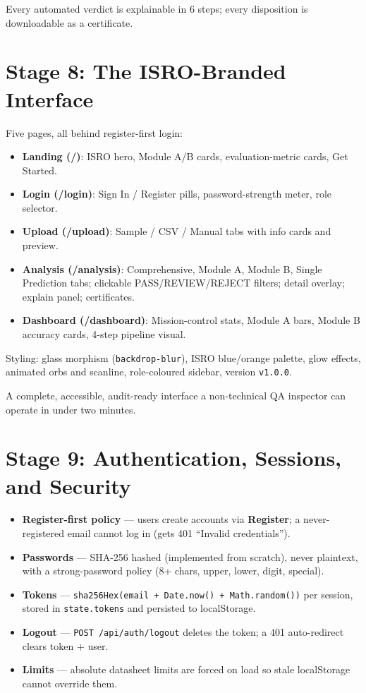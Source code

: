 \documentclass[11pt,a4paper]{article}
\newcommand{\code}[1]{\texttt{\small #1}}
\newcommand{\keys}[1]{\textbf{\sffamily#1}}
\newcommand{\milestone}[1]{\par\vspace{0.6em}\noindent
  \begin{tcolorbox}[colback=solgreen!8,colframe=solgreen,
    title={\sffamily\bfseries\color{white}Milestone},arc=2pt,boxrule=1pt]
    #1
  \end{tcolorbox}\par\vspace{0.4em}}
\begin{document}
\milestone{Every automated verdict is explainable in 6 steps; every disposition is downloadable as
  a certificate.}

\section{Stage 8: The ISRO-Branded Interface}

Five pages, all behind register-first login:
\begin{itemize}[leftmargin=1.5em]
  \item \textbf{Landing (/)}: ISRO hero, Module A/B cards, evaluation-metric cards, Get Started.
  \item \textbf{Login (/login)}: Sign In / Register pills, password-strength meter, role selector.
  \item \textbf{Upload (/upload)}: Sample / CSV / Manual tabs with info cards and preview.
  \item \textbf{Analysis (/analysis)}: Comprehensive, Module A, Module B, Single Prediction tabs;
        clickable PASS/REVIEW/REJECT filters; detail overlay; explain panel; certificates.
  \item \textbf{Dashboard (/dashboard)}: Mission-control stats, Module A bars, Module B accuracy
        cards, 4-step pipeline visual.
\end{itemize}

\noindent Styling: glass morphism (\code{backdrop-blur}), ISRO blue/orange palette, glow effects,
animated orbs and scanline, role-coloured sidebar, version \code{v1.0.0}.

\milestone{A complete, accessible, audit-ready interface a non-technical QA inspector can operate
  in under two minutes.}

\section{Stage 9: Authentication, Sessions, and Security}

\begin{itemize}[leftmargin=1.5em]
  \item \textbf{Register-first policy} --- users create accounts via \keys{Register}; a
        never-registered email cannot log in (gets 401 ``Invalid credentials'').
  \item \textbf{Passwords} --- SHA-256 hashed (implemented from scratch), never plaintext, with a
        strong-password policy (8+ chars, upper, lower, digit, special).
  \item \textbf{Tokens} --- \code{sha256Hex(email + Date.now() + Math.random())} per session,
        stored in \code{state.tokens} and persisted to localStorage.
  \item \textbf{Logout} --- \code{POST /api/auth/logout} deletes the token; a 401 auto-redirect
        clears token + user.
  \item \textbf{Limits} --- absolute datasheet limits are forced on load so stale localStorage
        cannot override them.
\end{itemize}
\end{document}
